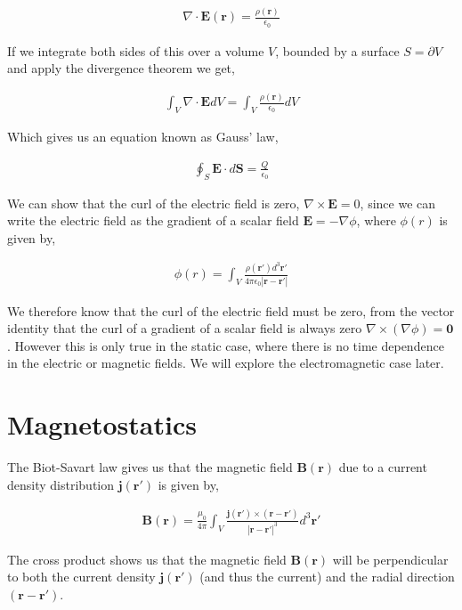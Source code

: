 \documentclass[11pt]{amsart}
\begin{document}
\begin{align*}
  \nabla\cdot\mathbf{E}(\mathbf{r}) = \frac{\rho(\mathbf{r})}{\epsilon_0}
\end{align*}

If we integrate both sides of this over a volume $V$, bounded by a surface $S = \partial V$ and apply the divergence theorem we get,

\begin{align*}
  \int_V \nabla\cdot\mathbf{E} dV = \int_V \frac{\rho(\mathbf{r})}{\epsilon_0} dV
\end{align*}

Which gives us an equation known as Gauss' law,

\begin{align*}
  \oint_S \mathbf{E}\cdot d\mathbf{S} = \frac{Q}{\epsilon_0}
\end{align*}

We can show that the curl of the electric field is zero, $\nabla\times\mathbf{E}=0$, since we can write the electric field as the gradient of a scalar field $\mathbf{E} = -\nabla\phi$, where $\phi(r)$ is given by,

\begin{align*}
  \phi(r) = \int_V \frac{\rho(\mathbf{r'})d^3\mathbf{r'}}{4\pi\epsilon_0 |\mathbf{r} - \mathbf{r'}|}
\end{align*}

We therefore know that the curl of the electric field must be zero, from the vector identity that the curl of a gradient of a scalar field is always zero $\nabla\times(\nabla\phi) = \mathbf{0}$. However this is only true in the static case, where there is no time dependence in the electric or magnetic fields. We will explore the electromagnetic case later.


\section{Magnetostatics}


The Biot-Savart law gives us that the magnetic field $\mathbf{B}(\mathbf{r})$ due to a current density distribution $\mathbf{j}(\mathbf{r'})$ is given by,

\begin{align*}
  \mathbf{B}(\mathbf{r})=\frac{\mu_0}{4\pi}\int_V\frac{\mathbf{j}(\mathbf{r'})\times(\mathbf{r}-\mathbf{r'})}{{|\mathbf{r}-\mathbf{r'}|}^3} d^3\mathbf{r'}
\end{align*}

The cross product shows us that the magnetic field $\mathbf{B}(\mathbf{r})$ will be perpendicular to both the current density $\mathbf{j}(\mathbf{r'})$ (and thus the current) and the radial direction $(\mathbf{r} - \mathbf{r'})$.
\end{document}
